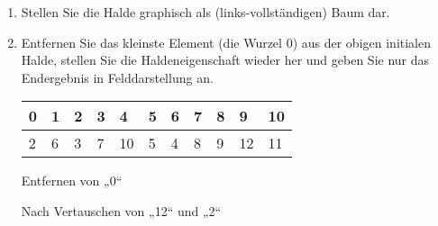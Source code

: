 \documentclass{bschlangaul-aufgabe}
\begin{document}
\begin{enumerate}


\item Stellen Sie die Halde graphisch als (links-vollständigen) Baum
dar.

\begin{liAntwort}
\begin{center}
\end{center}
\end{liAntwort}


\item Entfernen Sie das kleinste Element (die Wurzel 0) aus der obigen
initialen Halde, stellen Sie die Haldeneigenschaft wieder her und geben
Sie nur das Endergebnis in Felddarstellung an.

\begin{liAntwort}
\begin{tabular}{lllllllllll}
\bf{0}  & \bf{1}  & \bf{2}  & \bf{3}  & \bf{4}  & \bf{5}  & \bf{6}  & \bf{7}  & \bf{8}  & \bf{9}  & \bf{10} \\
\hline
2       & 6       & 3       & 7       & 10      & 5       & 4       & 8       & 9       & 12      & 11      \\
\end{tabular}
\end{liAntwort}

\begin{liAdditum}[zu b)]
\begin{liDiagramm}{Entfernen von „0“}
\end{liDiagramm}

\begin{liDiagramm}{Nach Vertauschen von „12“ und „2“}
\end{liDiagramm}


\end{liAdditum}
\end{enumerate}
\end{document}
